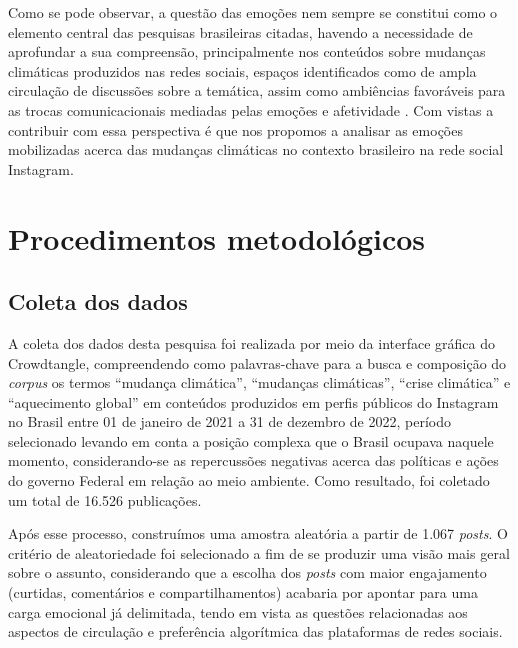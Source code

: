 \documentclass[portuguese]{textolivre}
\begin{document}
Como se pode observar, a questão das emoções nem sempre se constitui como o elemento central das pesquisas brasileiras citadas, havendo a necessidade de aprofundar a sua compreensão, principalmente nos conteúdos sobre mudanças climáticas produzidos nas redes sociais, espaços identificados como de ampla circulação de discussões sobre a temática, assim como ambiências favoráveis para as trocas comunicacionais mediadas pelas emoções e afetividade \cite{papacharissi2014affective,serrano2016internet}. Com vistas a contribuir com essa perspectiva é que nos propomos a analisar as emoções mobilizadas acerca das mudanças climáticas no contexto brasileiro na rede social Instagram.


\section{Procedimentos metodológicos}\label{sec-fmt-manuscrito}
\subsection{Coleta dos dados}
A coleta dos dados desta pesquisa foi realizada por meio da interface gráfica do Crowdtangle, compreendendo como palavras-chave para a busca e composição do \textit{corpus} os termos “mudança climática”, “mudanças climáticas”, “crise climática” e “aquecimento global” em conteúdos produzidos em perfis públicos do Instagram no Brasil entre 01 de janeiro de 2021 a 31 de dezembro de 2022, período selecionado levando em conta a posição complexa que o Brasil ocupava naquele momento, considerando-se as repercussões negativas acerca das políticas e ações do governo Federal em relação ao meio ambiente. Como resultado, foi coletado um total de 16.526 publicações.

Após esse processo, construímos uma amostra aleatória a partir de 1.067 \textit{posts}. O critério de aleatoriedade foi selecionado a fim de se produzir uma visão mais geral sobre o assunto, considerando que a escolha dos \textit{posts} com maior engajamento (curtidas, comentários e compartilhamentos) acabaria por apontar para uma carga emocional já delimitada, tendo em vista as questões relacionadas aos aspectos de circulação e preferência algorítmica \cite{berger2012viral} das plataformas de redes sociais.
\end{document}
